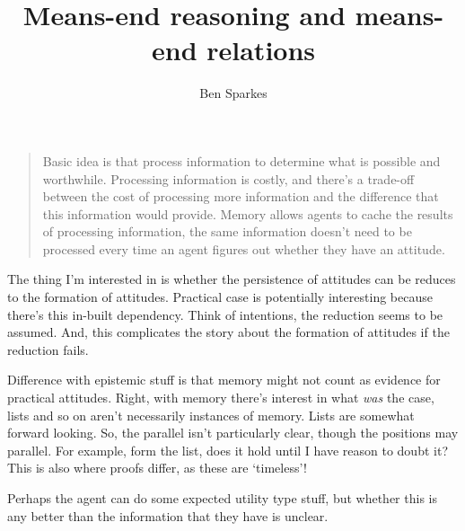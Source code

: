 \documentclass[10pt]{article}
\title{Means-end reasoning and means-end relations}
\author{Ben Sparkes}
\begin{document}
\begin{quote}
  Basic idea is that process information to determine what is possible and worthwhile.
  Processing information is costly, and there's a trade-off between the cost of processing more information and the difference that this information would provide.
  Memory allows agents to cache the results of processing information, the same information doesn't need to be processed every time an agent figures out whether they have an attitude.
\end{quote}


\begin{note}
  The thing I'm interested in is whether the persistence of attitudes can be reduces to the formation of attitudes.
  Practical case is potentially interesting because there's this in-built dependency.
  Think of intentions, the reduction seems to be assumed.
  And, this complicates the story about the formation of attitudes if the reduction fails.
\end{note}

Difference with epistemic stuff is that memory might not count as evidence for practical attitudes.
Right, with memory there's interest in what \emph{was} the case, lists and so on aren't necessarily instances of memory.
Lists are somewhat forward looking.
So, the parallel isn't particularly clear, though the positions may parallel.
For example, form the list, does it hold until I have reason to doubt it?
This is also where proofs differ, as these are `timeless'!

\maketitle

\begin{note}
  Perhaps the agent can do some expected utility type stuff, but whether this is any better than the information that they have is unclear.
\end{note}
\end{document}
